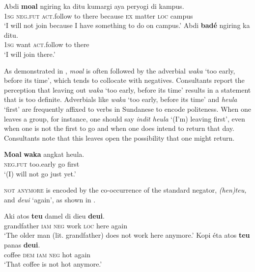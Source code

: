\documentclass[output=paper]{langscibook}
\begin{document}
\ea\label{ex:sun:3} 
    \ea\label{ex:sun:3a}
        \gll  Abdi \textbf{moal} ngiring ka ditu kumargi aya peryogi di kampus.\\ 
               1\textsc{sg} \textsc{neg}.\textsc{fut} \textsc{act}.follow to there because \textsc{ex} matter \textsc{loc} campus\\
        \glt ‘I will not join because I have something to do on campus.’
    \ex\label{ex:sun:3b}
        \gll  Abdi \textbf{badé} ngiring ka ditu.\\
             1\textsc{sg} want \textsc{act}.follow to there\\
        \glt ‘I will join there.’ \citep[76]{Butters2021} 
    \z
\z 

As demonstrated in , \textit{moal} is often followed by the adverbial \textit{waka} ‘too early, before its time’, which tends to collocate with negatives. Consultants report the perception that leaving out \textit{waka} ‘too early, before its time’ results in a statement that is too definite. Adverbials like \textit{waka} ‘too early, before its time’ and \textit{heula} ‘first’ are frequently affixed to verbs in Sundanese to encode politeness. When one leaves a group, for instance, one should say \textit{indit heula} ‘(I’m) leaving first’, even when one is not the first to go and when one does intend to return that day. Consultants note that this leaves open the possibility that one might return. 

\ea\label{ex:sun:4} 
    \gll  \textbf{Moal} \textbf{waka} angkat heula.\\ 
          \textsc{neg}.\textsc{fut} too.early go first\\
    \glt ‘(I) will not go just yet.’ \citep[77]{Butters2021}
\z 

\textsc{not} \textsc{anymore} is encoded by the co-occurrence of the standard negator, \textit{(hen)teu,} and \textit{deui} ‘again’, as shown in . 

\ea\label{ex:sun:5}
    \ea\label{ex:sun:5a}
        \gll  Aki atos \textbf{teu} damel di dieu \textbf{deui}.\\ 
              grandfather \textsc{iam} \textsc{neg} work \textsc{loc} here again\\
        \glt  ‘The older man (lit. grandfather) does not work here anymore.’ 
    \ex\label{ex:sun:5b}
        \gll  Kopi éta atos \textbf{teu} panas \textbf{deui}.\\
             coffee \textsc{dem} \textsc{iam} \textsc{neg} hot again\\
        \glt ‘That coffee is not hot anymore.’ 
    \z
\z 
\end{document}

